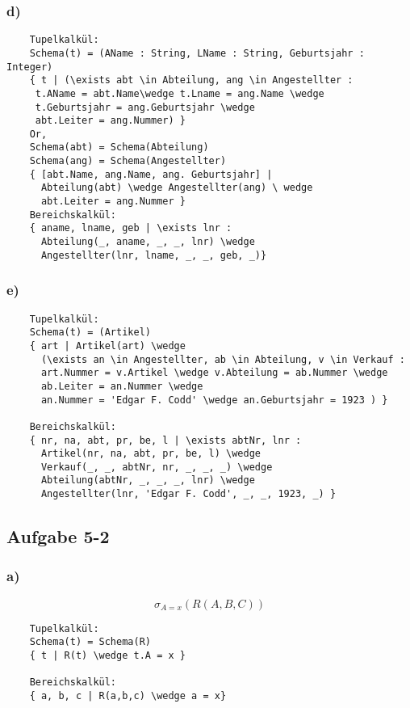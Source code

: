 \subsubsection{d)}
\begin{verbatim}
    Tupelkalkül:
    Schema(t) = (AName : String, LName : String, Geburtsjahr : Integer)
    { t | (\exists abt \in Abteilung, ang \in Angestellter : 
     t.AName = abt.Name\wedge t.Lname = ang.Name \wedge
     t.Geburtsjahr = ang.Geburtsjahr \wedge
     abt.Leiter = ang.Nummer) }
    Or,
    Schema(abt) = Schema(Abteilung)
    Schema(ang) = Schema(Angestellter)
    { [abt.Name, ang.Name, ang. Geburtsjahr] | 
      Abteilung(abt) \wedge Angestellter(ang) \ wedge
      abt.Leiter = ang.Nummer }
    Bereichskalkül:
    { aname, lname, geb | \exists lnr : 
      Abteilung(_, aname, _, _, lnr) \wedge
      Angestellter(lnr, lname, _, _, geb, _)}
\end{verbatim}

\subsubsection{e)}
\begin{verbatim}
    Tupelkalkül:
    Schema(t) = (Artikel)
    { art | Artikel(art) \wedge
      (\exists an \in Angestellter, ab \in Abteilung, v \in Verkauf :
      art.Nummer = v.Artikel \wedge v.Abteilung = ab.Nummer \wedge
      ab.Leiter = an.Nummer \wedge
      an.Nummer = 'Edgar F. Codd' \wedge an.Geburtsjahr = 1923 ) }

    Bereichskalkül:
    { nr, na, abt, pr, be, l | \exists abtNr, lnr :
      Artikel(nr, na, abt, pr, be, l) \wedge
      Verkauf(_, _, abtNr, nr, _, _, _) \wedge 
      Abteilung(abtNr, _, _, _, lnr) \wedge
      Angestellter(lnr, 'Edgar F. Codd', _, _, 1923, _) }
\end{verbatim}

\subsection{Aufgabe 5-2}
\subsubsection{a)}
\[\sigma_{A=x}(R(A,B,C))\]
\begin{verbatim}
    Tupelkalkül:
    Schema(t) = Schema(R)
    { t | R(t) \wedge t.A = x }

    Bereichskalkül:
    { a, b, c | R(a,b,c) \wedge a = x}
\end{verbatim}

